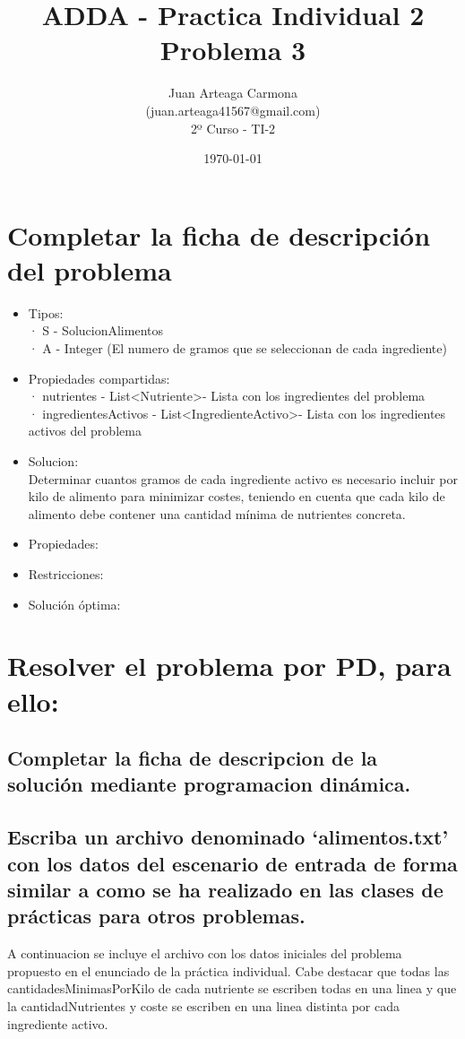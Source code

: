 \documentclass[a4paper,12pt]{article}
\title{ADDA - Practica Individual 2\\ Problema 3}
\author{Juan Arteaga Carmona\\(juan.arteaga41567@gmail.com)\\2º Curso - TI-2}
\date{\today}
\begin{document}
\maketitle

\section{Completar la ficha de descripción del problema}

\begin{itemize}
 \item Tipos:\\
 · S - SolucionAlimentos\\
 · A - Integer \in [0,1000] (El numero de gramos que se seleccionan de cada ingrediente)

 \item Propiedades compartidas:\\
 · nutrientes - List\textless Nutriente\textgreater - Lista con los ingredientes del problema\\
 · ingredientesActivos - List\textless IngredienteActivo\textgreater - Lista con los ingredientes activos del problema

 \item Solucion:\\
Determinar cuantos gramos de cada ingrediente activo es necesario incluir por kilo
de alimento para minimizar costes, teniendo en cuenta que cada kilo de alimento debe
contener una cantidad mínima de nutrientes concreta.

\item Propiedades:\\

\item Restricciones:

\item Solución óptima:\\


\end{itemize}
\section{Resolver el problema por PD, para ello:}
\subsection{Completar la ficha de descripcion de la solución mediante programacion dinámica.}

\subsection{Escriba un archivo denominado `alimentos.txt' con los datos del escenario de entrada de forma similar a como se ha realizado en las clases de prácticas para otros problemas.}
A continuacion se incluye el archivo con los datos iniciales del problema propuesto en el enunciado de la práctica individual.
Cabe destacar que todas las cantidadesMinimasPorKilo de cada nutriente se escriben todas en una linea
y que la cantidadNutrientes y coste se escriben en una linea distinta por cada ingrediente activo.
\inputminted[fontsize=\footnotesize,breaklines]{text}{ficheros/alimentos.txt}
\end{document}
